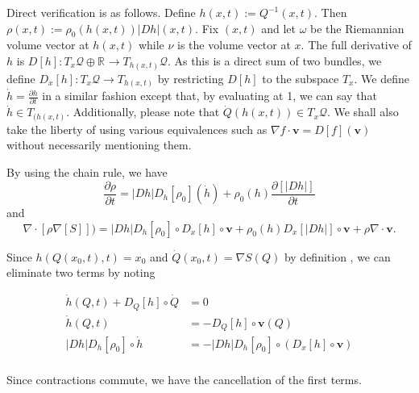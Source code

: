 \documentclass[11pt]{article}
\theoremstyle{remark}
\begin{document}
Direct verification is as follows. 
Define $h(x,t) \ensuremath{:=}
Q^{-1}(x,t)$. Then $\ensuremath{\rho}(x,t) \ensuremath{:=} \ensuremath{\rho}_0(h(x,t)) \ensuremath{\lvert {Dh} \rvert} (x,t)$. 
Fix $(x,t)$ and let $\omega$ be the Riemannian volume vector
at $h(x,t)$ while $\nu$ is the volume vector at $x$. The full
derivative of $h$ is $D [h] : T_x \ensuremath{\mathcal{Q}} \oplus \ensuremath{\mathbb{R}^{}} \to T_{h(x,t)}
\ensuremath{\mathcal{Q}}$. As this is a direct sum of two bundles, we define $D_x [h] :
T_x \ensuremath{\mathcal{Q}} \to T_{h(x,t)}$ by restricting $D[h]$ to the subspace
  $T_x$. We define $\dot{h} = \ensuremath{\frac{\partial {h}}{\partial {t}}}$ in a similar fashion
   except that, by evaluating
at 1, we can say that $\dot{h} \in T_{(h(x,t)}$. Additionally, please note that
$\dot{Q}(h(x,t)) \in T_x\ensuremath{\mathcal{Q}}$.  We shall also take
the liberty of using various equivalences such as $\nabla f \cdot
\ensuremath{\boldsymbol{v}} = D[f] (\ensuremath{\boldsymbol{v}})$ without necessarily mentioning them.


By using the chain rule, we have  
\[
\ensuremath{\frac{\partial {\ensuremath{\rho}}}{\partial {t}}}   = \ensuremath{\lvert {Dh} \rvert} D_h [\ensuremath{\rho}_0] ( \dot{h}) 
+ \ensuremath{\rho}_0(h) \ensuremath{\frac{\partial {[\ensuremath{\lvert {Dh} \rvert}]}}{\partial {t}}}  
\]
and 
\[ \nabla \cdot [ \ensuremath{\rho} \nabla [S] ])   = \ensuremath{\lvert {Dh} \rvert} D_h [\ensuremath{\rho}_0] \circ D_x[h] 
\circ \ensuremath{\boldsymbol{v}}    + \ensuremath{\rho}_0(h) D_x[\ensuremath{\lvert {Dh} \rvert}] \circ \ensuremath{\boldsymbol{v}}   
+ \ensuremath{\rho}  \nabla \cdot \ensuremath{\boldsymbol{v}} . 
\] 


Since $h(Q(x_0,t), t) = x_0$ and $\dot{Q}(x_0,t) = \nabla S (Q)$ 
 by definition , we can eliminate two terms
by noting 

\begin{align*}
\dot{h} (Q, t) + D_Q[h] \circ \dot{Q}  & = 0 \\ 
\dot{h} (Q, t) &= - D_Q[h] \circ \ensuremath{\boldsymbol{v}} (Q)\\
\ensuremath{\lvert {Dh} \rvert} D_h [\ensuremath{\rho}_0] \circ \dot h 
  & = - \ensuremath{\lvert {Dh} \rvert}D_h [\ensuremath{\rho}_0] \circ (  D_x[h] \circ \ensuremath{\boldsymbol{v}} ) \\ 
\end{align*}


Since contractions commute, we have the cancellation of the first terms. 
\end{document}
